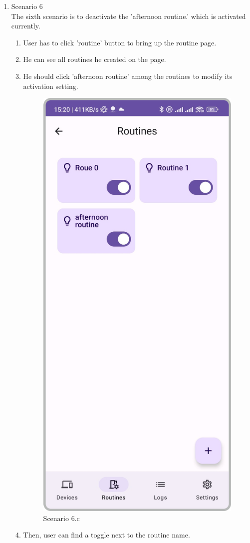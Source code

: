 \begin{enumerate}
    \item Scenario 6\\
          The sixth scenario is to deactivate the 'afternoon routine.' which is activated currently.\\
          \begin{enumerate}
              \item User has to click 'routine' button to bring up the routine page.\\
              \item He can see all routines he created on the page.\\
              \item He should click 'afternoon routine' among the routines to modify its activation setting.\\
                    \begin{figure}[hbt!]
                        \centering
                        \includegraphics[width=0.5\linewidth]{imgs/usercase/scenario6-a.png}
                        \caption{Scenario 6.c}                        
                    \end{figure}
              \newpage
              \item Then, user can find a toggle next to the routine name.\\

\end{enumerate}
\end{enumerate}
